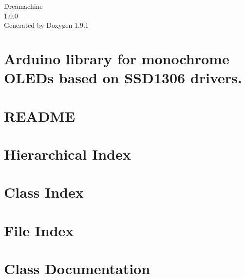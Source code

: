 \let\mypdfximage\pdfximage\def\pdfximage{\immediate\mypdfximage}\documentclass[twoside]{book}
\newcommand{\+}{\discretionary{\mbox{\scriptsize$\hookleftarrow$}}{}{}}
\newcommand{\clearemptydoublepage}{%
  \newpage{\pagestyle{empty}\cleardoublepage}%
}
\begin{document}
\raggedbottom

\hypersetup{pageanchor=false,
             bookmarksnumbered=true,
             pdfencoding=unicode
            }
\begin{titlepage}
\vspace*{7cm}
\begin{center}%
{\Large Dreamachine \\[1ex]\large 1.\+0.\+0 }\\
\vspace*{1cm}
{\large Generated by Doxygen 1.9.1}\\
\end{center}
\end{titlepage}
\clearemptydoublepage
{}
\tableofcontents
\clearemptydoublepage
{}
\hypersetup{pageanchor=true}

\chapter{Arduino library for monochrome OLEDs based on SSD1306 drivers.}
\label{index}\hypertarget{index}{}
\chapter{README}
\label{md_lib__s_s_d1306__mod__r_e_a_d_m_e}

\chapter{Hierarchical Index}

\chapter{Class Index}

\chapter{File Index}

\chapter{Class Documentation}

























\end{document}
